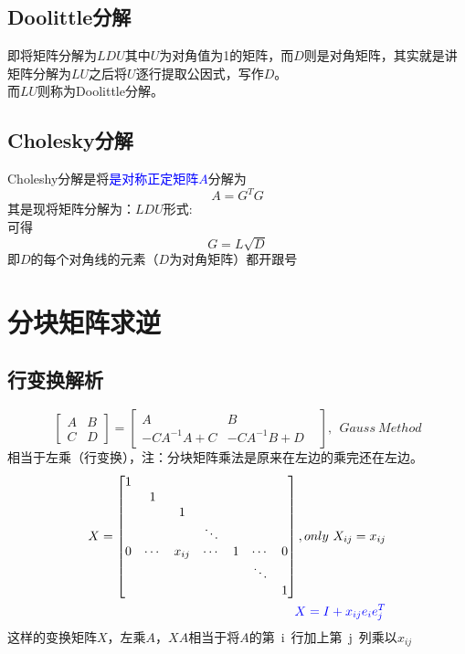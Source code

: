 \documentclass[12pt]{article}
\begin{document}
\begin{CJK*}{UTF8}{gbsn}
\subsection{Doolittle分解}
即将矩阵分解为$LDU$其中$U$为对角值为1的矩阵，而$D$则是对角矩阵，其实就是讲矩阵分解为$LU$之后将$U$逐行提取公因式，写作$D$。\\
而$LU$则称为Doolittle分解。
\subsection{Cholesky分解}
Choleshy分解是将\textcolor{blue}{是对称正定矩阵$A$}分解为
\begin{equation}
	A=G^TG
\end{equation}
其是现将矩阵分解为：$LDU$形式:\\
可得\begin{equation}
	G=L\sqrt{D}
\end{equation}
即$D$的每个对角线的元素（$D$为对角矩阵）都开跟号

\section{分块矩阵求逆}
\subsection{行变换解析}
\begin{equation}
	\begin{bmatrix}
	A& B \\
	C& D 
\end{bmatrix}=
\begin{bmatrix}
	A& B& \\
	-CA^{-1}A+C& -CA^{-1}B+D& 
\end{bmatrix},~~Gauss~Method
\end{equation}
相当于左乘（行变换），注：分块矩阵乘法是原来在左边的乘完还在左边。
\begin{align*}
	X=\begin{bmatrix}
	1& &&  &&&\\
	& 1&& &&&\\
	& &1& &&&\\
	& &&\ddots &&&\\
	0&\cdots &x_{ij}&\cdots &1&\cdots &0\\
	& && &&\ddots &\\
	& && &&&1\\
	\end{bmatrix},only~X_{ij}=x_{ij}\\
	\textcolor{blue}{X=I+x_{ij}e_ie_j^T}
\end{align*}
这样的变换矩阵$X$，左乘$A$，$XA$相当于将$A$的第~i~行加上第~j~列乘以$x_{ij}$\\


\end{CJK*}
\end{document}
